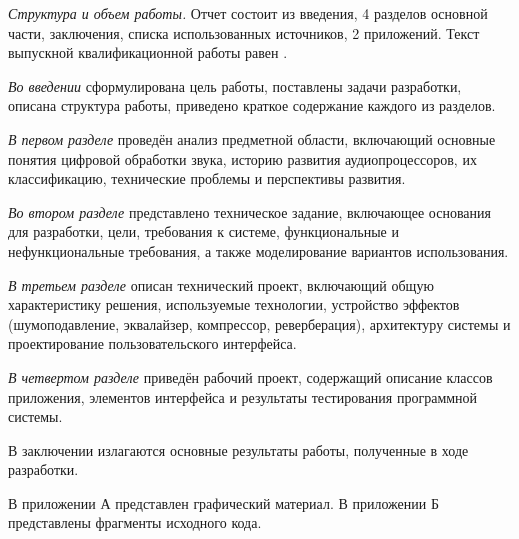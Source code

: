 \emph{Структура и объем работы.} Отчет состоит из введения, 4 разделов основной части, заключения, списка использованных источников, 2 приложений. Текст выпускной квалификационной работы равен .

\emph{Во введении} сформулирована цель работы, поставлены задачи разработки, описана структура работы, приведено краткое содержание каждого из разделов.

\emph{В первом разделе} проведён анализ предметной области, включающий основные понятия цифровой обработки звука, историю развития аудиопроцессоров, их классификацию, технические проблемы и перспективы развития.

\emph{Во втором разделе} представлено техническое задание, включающее основания для разработки, цели, требования к системе, функциональные и нефункциональные требования, а также моделирование вариантов использования.

\emph{В третьем разделе} описан технический проект, включающий общую характеристику решения, используемые технологии, устройство эффектов (шумоподавление, эквалайзер, компрессор, реверберация), архитектуру системы и проектирование пользовательского интерфейса.

\emph{В четвертом разделе} приведён рабочий проект, содержащий описание классов приложения, элементов интерфейса и результаты тестирования программной системы.

В заключении излагаются основные результаты работы, полученные в ходе разработки.

В приложении А представлен графический материал.
В приложении Б представлены фрагменты исходного кода. 